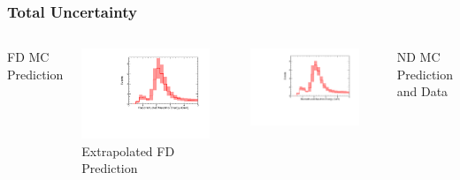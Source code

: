 \documentclass[10pt,professionalfonts,xcolor=table]{beamer}
\begin{document}
\begin{frame}
\frametitle{Total Uncertainty}
\begin{columns}[t]
\centering
\textcolor{custom_red}{FD MC Prediction}
\vspace{-10pt}

\includegraphics[angle=-90, width=0.85\textwidth]{figures/systs/prediction/fd_mc_prediction_full_syst.pdf}
\vspace{15pt}
\textcolor{custom_red}{Extrapolated FD Prediction}
\vspace{-10pt}

\includegraphics[angle=-90, width=0.85\textwidth]{figures/systs/prediction/fd_extrap_prediction_full_syst.pdf}

\centering
\textcolor{custom_red}{ND MC Prediction and Data}
\vspace{-10pt}


\end{columns}
\end{frame}
\end{document}
